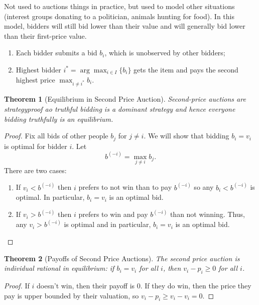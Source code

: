 \documentclass[dvipsnames]{article}
\newtheorem{theorem}{Theorem}[section]
\theoremstyle{definition}
\theoremstyle{remark}
\newenvironment{mech}[1]{\begin{tcolorbox}[colback=red!5!white,colframe=red!75!black,title={#1}]}{\end{tcolorbox}}
\begin{document}
Not used to auctions things in practice, but used to model other situations (interest groups donating to a politician, animals hunting for food). In this model, bidders will still bid lower than their value and will generally bid lower than their first-price value.

\begin{mech}{Second-Price Auction}
	\begin{enumerate}
		\item Each bidder submits a bid $b_i$, which is unobserved by other bidders;
		\item Highest bidder $i^* = \arg\max_{i \in I}\{b_i\}$ gets the item and pays the second highest price $\max_{i \neq i^*} b_i$.
	\end{enumerate}
\end{mech}

\begin{theorem}[Equilibrium in Second Price Auction]
	Second-price auctions are strategyproof ao truthful bidding is a dominant strategy and hence everyone bidding truthfully is an equilibrium.
\end{theorem}

\begin{proof}
	Fix all bids of other people $b_j$ for $j \neq i$. We will show that bidding $b_i = v_i$ is optimal for bidder $i$. Let 
	$$b^{(-i)} = \max_{j \neq i} b_j.$$
	There are two cases:
	\begin{enumerate}
		\item If $v_i < b^{(-i)}$ then $i$ prefers to not win than to pay $b^{(-i)}$ so any $b_i < b^{(-i)}$ is optimal. In particular, $b_i = v_i$ is an optimal bid.
		\item If $v_i > b^{(-i)}$ then $i$ prefers to win and pay $b^{(-i)}$ than not winning. Thus, any $v_i > b^{(-i)}$ is optimal and in particular, $b_i = v_i$ is an optimal bid.
	\end{enumerate}
\end{proof}

\begin{theorem}[Payoffs of Second Price Auctions]
	The second price auction is individual rational in equilibrium: if $b_i = v_i$ for all $i$, then $v_i - p_i \geq 0$ for all $i$.
\end{theorem}
\begin{proof}
	If $i$ doesn't win, then their payoff is $0$. If they do win, then the price they pay is upper bounded by their valuation, so $v_i - p_i \geq v_i - v_i = 0$.
\end{proof}
\end{document}
